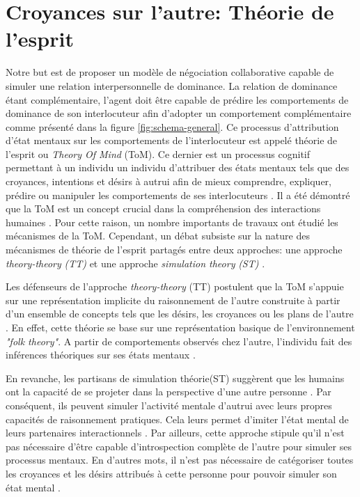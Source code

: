 \section{Croyances sur l'autre: Théorie de l'esprit}
Notre but est de proposer un modèle de négociation collaborative capable de simuler une relation interpersonnelle de dominance. La relation de dominance étant complémentaire, l'agent doit être capable de prédire les comportements de dominance de son interlocuteur afin d'adopter un comportement complémentaire comme présenté dans la figure \ref{fig:schema-general}. 
Ce processus d'attribution d'état mentaux sur les comportements de l'interlocuteur est appelé théorie de l'esprit ou \emph{Theory Of Mind} (ToM). Ce dernier est un processus cognitif permettant à un individu un individu d'attribuer des états mentaux tels que des croyances, intentions et désirs à autrui afin de mieux comprendre, expliquer, prédire ou manipuler les comportements de ses interlocuteurs \cite{harbers2012modeling}. Il a été démontré que la ToM est un concept crucial dans la compréhension des interactions humaines \cite{whiten1991natural,byom2013theory}. Pour cette raison, un nombre importants de travaux ont étudié les mécanismes de la ToM. Cependant, un débat subsiste sur la nature des mécanismes de théorie de l’esprit partagés entre deux approches: une approche \textit{theory-theory}  \emph{(TT)} et une approche \textit{simulation theory} \emph{(ST)} \cite{harbers2012modeling,shanton2010simulation}.

Les défenseurs de l'approche \textit{theory-theory} (TT) postulent que la ToM s’appuie sur une représentation implicite du raisonnement de l'autre construite à partir d'un ensemble de concepts tels que les désirs, les croyances ou les plans de l'autre \cite{harbers2012modeling}. En effet, cette théorie se base sur une représentation basique de l'environnement \emph{"folk theory"}. A partir de comportements observés chez l'autre, l'individu fait des inférences théoriques sur ses états mentaux \cite{shanton2010simulation}.

En revanche, les partisans de simulation théorie(ST) suggèrent que les humains ont la capacité de se projeter dans la perspective d'une autre personne \cite{shanton2010simulation}.
Par conséquent, ils peuvent simuler l'activité mentale d'autrui avec leurs propres capacités de raisonnement pratiques. Cela leurs permet d'imiter l'état mental de leurs partenaires interactionnels \cite{harbers2009modeling}.
Par ailleurs, cette approche stipule qu'il n'est pas nécessaire d'être capable d'introspection complète de l'autre pour simuler ses processus mentaux. En d'autres mots, il n'est pas nécessaire de catégoriser toutes les croyances et les désirs attribués à cette personne pour pouvoir simuler son état mental \cite{harbers2012modeling}.

